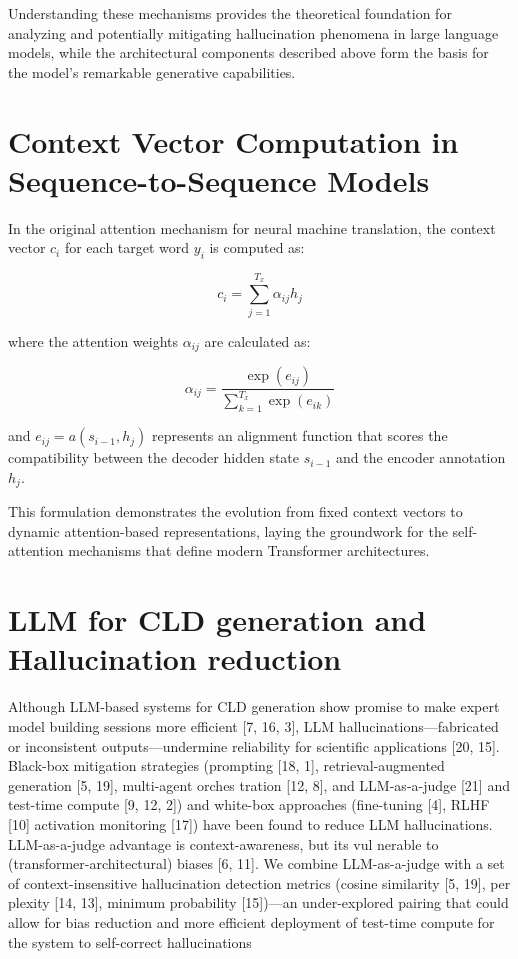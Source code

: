 Understanding these mechanisms provides the theoretical foundation for analyzing and potentially mitigating hallucination phenomena in large language models, while the architectural components described above form the basis for the model's remarkable generative capabilities.

\section{Context Vector Computation in Sequence-to-Sequence Models}

In the original attention mechanism for neural machine translation, the context vector $c_i$ for each target word $y_i$ is computed as:

\begin{equation}
c_i = \sum_{j=1}^{T_x} \alpha_{ij} h_j
\end{equation}

where the attention weights $\alpha_{ij}$ are calculated as:

\begin{equation}
\alpha_{ij} = \frac{\exp(e_{ij})}{\sum_{k=1}^{T_x} \exp(e_{ik})}
\end{equation}

and $e_{ij} = a(s_{i-1}, h_j)$ represents an alignment function that scores the compatibility between the decoder hidden state $s_{i-1}$ and the encoder annotation $h_j$.

This formulation demonstrates the evolution from fixed context vectors to dynamic attention-based representations, laying the groundwork for the self-attention mechanisms that define modern Transformer architectures.


\section*{LLM for CLD generation and Hallucination reduction}


 Although LLM-based systems for CLD generation show promise to make expert model
 building sessions more efficient [7, 16, 3], LLM hallucinations—fabricated or inconsistent
 outputs—undermine reliability for scientific applications [20, 15]. Black-box mitigation
 strategies (prompting [18, 1], retrieval-augmented generation [5, 19], multi-agent orches
tration [12, 8], and LLM-as-a-judge [21] and test-time compute [9, 12, 2]) and white-box
 approaches (fine-tuning [4], RLHF [10] activation monitoring [17]) have been found to
 reduce LLM hallucinations. LLM-as-a-judge advantage is context-awareness, but its vul
nerable to (transformer-architectural) biases [6, 11]. We combine LLM-as-a-judge with
 a set of context-insensitive hallucination detection metrics (cosine similarity [5, 19], per
plexity [14, 13], minimum probability [15])—an under-explored pairing that could allow
 for bias reduction and more efficient deployment of test-time compute for the system to
 self-correct hallucinations

